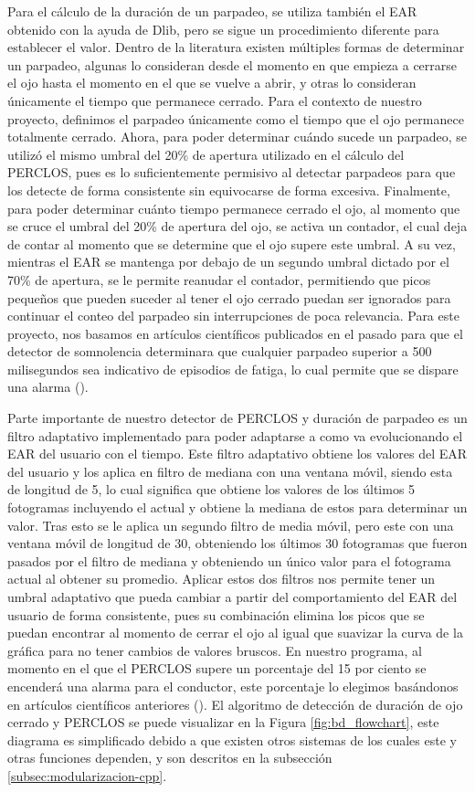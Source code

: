 Para el cálculo de la duración de un parpadeo, se utiliza también el EAR obtenido con la ayuda de Dlib, pero se sigue un procedimiento diferente para establecer el valor. Dentro de la literatura existen múltiples formas de determinar un parpadeo, algunas lo consideran desde el momento en que empieza a cerrarse el ojo hasta el momento en el que se vuelve a abrir, y otras lo consideran únicamente el tiempo que permanece cerrado. Para el contexto de nuestro proyecto, definimos el parpadeo únicamente como el tiempo que el ojo permanece totalmente cerrado. Ahora, para poder determinar cuándo sucede un parpadeo, se utilizó el mismo umbral del 20\% de apertura utilizado en el cálculo del PERCLOS, pues es lo suficientemente permisivo al detectar parpadeos para que los detecte de forma consistente sin equivocarse de forma excesiva. Finalmente, para poder determinar cuánto tiempo permanece cerrado el ojo, al momento que se cruce el umbral del 20\% de apertura del ojo, se activa un contador, el cual deja de contar al momento que se determine que el ojo supere este umbral. A su vez, mientras el EAR se mantenga por debajo de un segundo umbral dictado por el 70\% de apertura, se le permite reanudar el contador, permitiendo que picos pequeños que pueden suceder al tener el ojo cerrado puedan ser ignorados para continuar el conteo del parpadeo sin interrupciones de poca relevancia. Para este proyecto, nos basamos en artículos científicos publicados en el pasado para que el detector de somnolencia determinara que cualquier parpadeo superior a 500 milisegundos sea indicativo de episodios de fatiga, lo cual permite que se dispare una alarma (\cite{BlinkDuration}).

Parte importante de nuestro detector de PERCLOS y duración de parpadeo es un filtro adaptativo implementado para poder adaptarse a como va evolucionando el EAR del usuario con el tiempo. Este filtro adaptativo obtiene los valores del EAR del usuario y los aplica en filtro de mediana con una ventana móvil, siendo esta de longitud de 5, lo cual significa que obtiene los valores de los últimos 5 fotogramas incluyendo el actual y obtiene la mediana de estos para determinar un valor. Tras esto se le aplica un segundo filtro de media móvil, pero este con una ventana móvil de longitud de 30, obteniendo los últimos 30 fotogramas que fueron pasados por el filtro de mediana y obteniendo un único valor para el fotograma actual al obtener su promedio. Aplicar estos dos filtros nos permite tener un umbral adaptativo que pueda cambiar a partir del comportamiento del EAR del usuario de forma consistente, pues su combinación elimina los picos que se puedan encontrar al momento de cerrar el ojo al igual que suavizar la curva de la gráfica para no tener cambios de valores bruscos. En nuestro programa, al momento en el que el PERCLOS supere un porcentaje del 15 por ciento se encenderá una alarma para el conductor, este porcentaje lo elegimos basándonos en artículos científicos anteriores (\cite{MinhasPERCLOS}). El algoritmo de detección de duración de ojo cerrado y PERCLOS se puede visualizar en la Figura \ref{fig:bd_flowchart}, este diagrama es simplificado debido a que existen otros sistemas de los cuales este y otras funciones dependen, y son descritos en la subsección \ref{subsec:modularizacion-cpp}.

